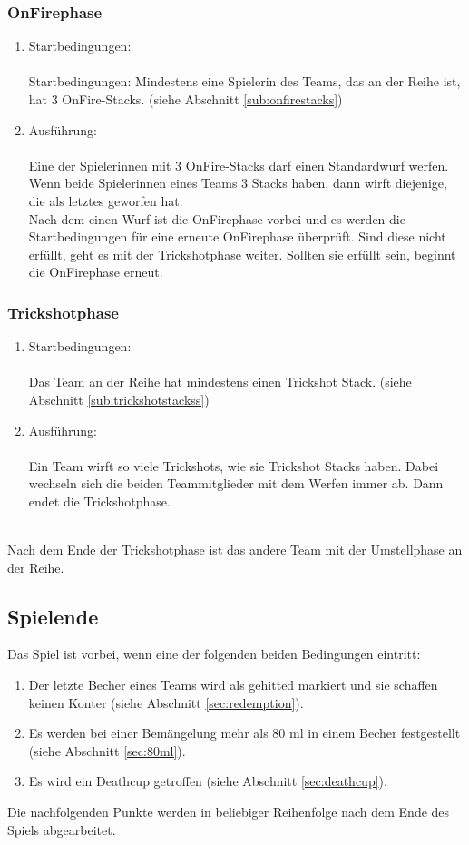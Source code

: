 \documentclass[a5paper, 12pt]{book}
\begin{document}
\subsubsection{OnFirephase}\label{subsub:onfirephase}
\begin{enumerate} [(1)]
    \item Startbedingungen:\\\\
    Startbedingungen: Mindestens eine Spielerin des Teams, das an der Reihe ist, hat 3 OnFire-Stacks. (siehe Abschnitt \ref{sub:onfirestacks})
    \item Ausführung:\\\\
    Eine der Spielerinnen mit 3 OnFire-Stacks darf 
 einen Standardwurf werfen. Wenn beide Spielerinnen eines Teams 3 Stacks haben, dann wirft diejenige, die als letztes geworfen hat. \\
Nach dem einen Wurf ist die OnFirephase vorbei und es werden die Startbedingungen für eine erneute OnFirephase überprüft. Sind diese nicht erfüllt, geht es mit der Trickshotphase weiter. Sollten sie erfüllt sein, beginnt die OnFirephase erneut.


\end{enumerate}
\subsubsection{Trickshotphase}\label{subsub:Trickshotphase}
\begin{enumerate} [(1)]
    \item Startbedingungen:\\\\
    Das Team an der Reihe hat mindestens einen Trickshot Stack. (siehe Abschnitt \ref{sub:trickshotstackss})
    \item Ausführung:\\\\
    Ein Team wirft so viele Trickshots, wie sie Trickshot Stacks haben. Dabei wechseln sich die beiden Teammitglieder mit dem Werfen immer ab. Dann endet die Trickshotphase. \\\\
\end{enumerate}
Nach dem Ende der Trickshotphase ist das andere Team mit der Umstellphase an der Reihe.
\subsection{Spielende}\label{sub:spielende}
Das Spiel ist vorbei, wenn eine der folgenden beiden Bedingungen eintritt:
\begin{enumerate}[(1)]
    \item Der letzte Becher eines Teams wird als gehitted markiert und sie schaffen keinen Konter (siehe Abschnitt \ref{sec:redemption}).
    \item Es werden bei einer Bemängelung mehr als 80 ml in einem Becher festgestellt (siehe Abschnitt \ref{sec:80ml}).
    \item Es wird ein Deathcup getroffen (siehe Abschnitt \ref{sec:deathcup}).
\end{enumerate}
Die nachfolgenden Punkte werden in beliebiger Reihenfolge nach dem Ende des Spiels abgearbeitet.
\end{document}
